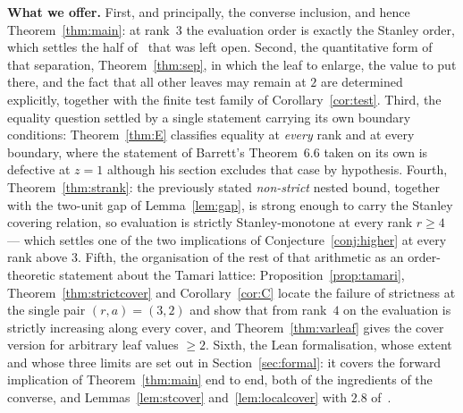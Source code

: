 \documentclass[11pt,a4paper]{article}
\theoremstyle{plain}
\theoremstyle{definition}
\begin{document}
\medskip
\noindent\textbf{What we offer.} First, and principally, the converse inclusion, and
hence Theorem~\ref{thm:main}: at rank~$3$ the evaluation order is exactly the Stanley
order, which settles the half of~\cite{MO} that was left open. Second, the quantitative
form of that separation, Theorem~\ref{thm:sep}, in which the leaf to enlarge, the value
to put there, and the fact that all other leaves may remain at $2$ are determined
explicitly, together with the finite test family of Corollary~\ref{cor:test}. Third, the
equality question settled by a single statement carrying its own boundary conditions:
Theorem~\ref{thm:E} classifies equality at \emph{every} rank and at every boundary,
where the statement of Barrett's Theorem~6.6 taken on its own is defective at $z=1$
although his section excludes that case by hypothesis. Fourth, Theorem~\ref{thm:strank}: the previously stated \emph{non-strict} nested bound,
together with the two-unit gap of Lemma~\ref{lem:gap}, is strong enough to carry
the Stanley covering relation, so evaluation is strictly Stanley-monotone at every rank
$r\ge4$ --- which settles one of the two implications of
Conjecture~\ref{conj:higher} at every rank above $3$. Fifth, the organisation of the
rest of that arithmetic as an order-theoretic statement about the Tamari lattice:
Proposition~\ref{prop:tamari}, Theorem~\ref{thm:strictcover} and Corollary~\ref{cor:C}
locate the failure of strictness at the single pair $(r,a)=(3,2)$ and show that from
rank~$4$ on the evaluation is strictly increasing along every cover, and
Theorem~\ref{thm:varleaf} gives the cover version for arbitrary leaf values $\ge2$.
Sixth, the Lean formalisation, whose extent and whose three limits are set out in
Section~\ref{sec:formal}: it covers the forward implication of
Theorem~\ref{thm:main} end to end, both of the ingredients of the converse, and
Lemmas~\ref{lem:stcover} and~\ref{lem:localcover} with $2.8$ of~\cite{CsW}.
\end{document}
